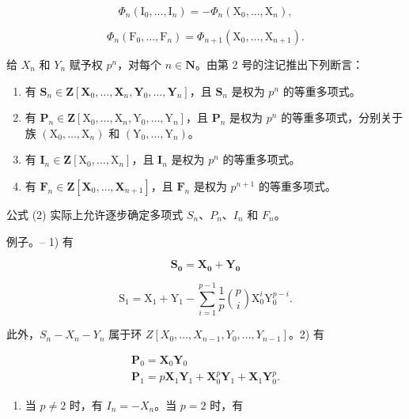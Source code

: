 \[
\Phi_ {n} (\mathrm{I} _ {0}, \dots , \mathrm{I} _ {n}) = - \Phi_ {n} (\mathrm{X} _ {0}, \dots , \mathrm{X} _ {n}),\tag{15}
\]

\[
\Phi_ {n} \left(\mathrm{F} _ {0}, \dots , \mathrm{F} _ {n}\right) = \Phi_ {n + 1} \left(\mathrm{X} _ {0}, \dots , \mathrm{X} _ {n + 1}\right).
\]

给 \(X_{n}\) 和 \(Y_{n}\) 赋予权 \(p^{n}\)，对每个 \(n \in \mathbf{N}\)。由第 2 号的注记推出下列断言：

\begin{enumerate}
\def\labelenumi{\alph{enumi})}
\item
  有 \(\mathbf{S}_n\in \mathbf{Z}[\mathbf{X}_0,\dots ,\mathbf{X}_n,\mathbf{Y}_0,\dots ,\mathbf{Y}_n]\)，且 \(\mathbf{S}_n\) 是权为 \(p^n\) 的等重多项式。
\item
  有 \(\mathbf{P}_n\in \mathbf{Z}[\mathrm{X}_0,\dots ,\mathrm{X}_n,\mathrm{Y}_0,\dots ,\mathrm{Y}_n]\)，且 \(\mathbf{P}_n\) 是权为 \(p^n\) 的等重多项式，分别关于族 \((\mathrm{X}_0,\dots ,\mathrm{X}_n)\) 和 \((\mathrm{Y}_0,\dots ,\mathrm{Y}_n)\)。
\item
  有 \(\mathbf{I}_n\in \mathbf{Z}[\mathrm{X}_0,\dots ,\mathrm{X}_n]\)，且 \(\mathbf{I}_n\) 是权为 \(p^n\) 的等重多项式。
\item
  有 \(\mathbf{F}_n\in \mathbf{Z}[\mathbf{X}_0,\dots ,\mathbf{X}_{n + 1}]\)，且 \(\mathbf{F}_n\) 是权为 \(p^{n + 1}\) 的等重多项式。
\end{enumerate}

公式 (2) 实际上允许逐步确定多项式 \(S_{n}\)、\(P_{n}\)、\(I_{n}\) 和 \(F_{n}\)。

例子。-- 1) 有

\[
\mathbf {S _ {0}} = \mathbf {X _ {0}} + \mathbf {Y _ {0}}
\]

\[
\mathrm{S} _ {1} = \mathrm{X} _ {1} + \mathrm{Y} _ {1} - \sum_ {i = 1} ^ {p - 1} \frac {1}{p} \binom {p} {i} \mathrm{X} _ {0} ^ {i} \mathrm{Y} _ {0} ^ {p - i}.
\]

此外，\(S_{n} - X_{n} - Y_{n}\) 属于环 \(Z[X_{0}, ..., X_{n-1}, Y_{0}, ..., Y_{n-1}]\)。2) 有

\[
\begin{array}{l} \mathbf {P} _ {0} = \mathbf {X} _ {0} \mathbf {Y} _ {0} \\ \mathbf {P} _ {1} = p \mathbf {X} _ {1} \mathbf {Y} _ {1} + \mathbf {X} _ {0} ^ {p} \mathbf {Y} _ {1} + \mathbf {X} _ {1} \mathbf {Y} _ {0} ^ {p}. \end{array}
\]

\begin{enumerate}
\def\labelenumi{\arabic{enumi})}
\setcounter{enumi}{2}
\tightlist
\item
  当 \(p \neq 2\) 时，有 \(I_n = -X_n\)。当 \(p = 2\) 时，有
\end{enumerate}

